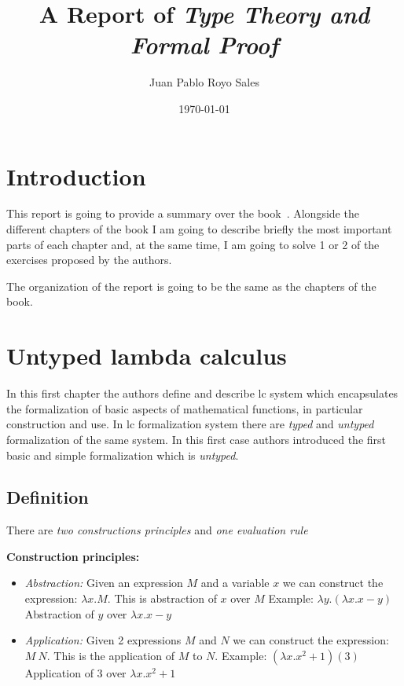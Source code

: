 \documentclass[12pt, a4paper]{article}
\title{%
      A Report of \textit{Type Theory and Formal Proof}
}
\author{Juan Pablo Royo Sales}
\affil{Universitat Politècnica de Catalunya}
\date\today
\begin{document}
\maketitle

\tableofcontents

\section{Introduction}
This report is going to provide a summary over the book~\cite{type_theory}.
Alongside the different chapters of the book I am going to describe briefly the most important parts of each chapter and, at the same time,
I am going to solve 1 or 2 of the exercises proposed by the authors.

The organization of the report is going to be the same as the chapters of the book.

\section{Untyped lambda calculus}
In this first chapter the authors define and describe \acrfull{lc} system which encapsulates the formalization of basic aspects
of mathematical functions, in particular construction and use. In \acrshort{lc} formalization system there are \textit{typed} and \textit{untyped} 
formalization of the same system. In this first case authors introduced the first basic and simple formalization which is \textit{untyped}.

\subsection{Definition}
There are \textit{two constructions principles} and \textit{one evaluation rule}

\textbf{Construction principles:}

\begin{itemize}
    \item \textit{Abstraction:} Given an expression $M$ and a variable $x$ we can construct the expression: $\lambda x.M$. This is abstraction of $x$ over $M$
    Example: $\lambda y.(\lambda x. x - y)$ Abstraction of $y$ over $\lambda x. x - y$
    \item \textit{Application:} Given 2 expressions $M$ and $N$ we can construct the expression: $M\ N$. This is the application of $M$ to $N$.
    Example: $(\lambda x.x^2 + 1)(3)$ Application of $3$ over $\lambda x.x^2 + 1$
\end{itemize}
\end{document}
